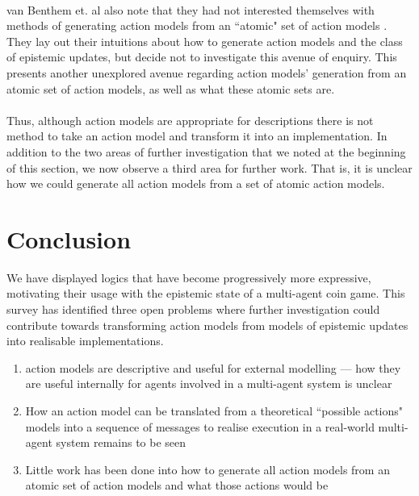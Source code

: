 \documentclass[12pt, a4paper, titlepage]{scrartcl}
\begin{document}
\\
van Benthem et. al also note that they had not interested themselves with methods of
generating action models from an ``atomic" set of action models \cite{benthem2006lcc}.
They lay out their intuitions about how to generate action models and the class
of epistemic updates, but decide not to investigate this avenue of enquiry.
This presents another unexplored avenue regarding action models' generation from
an atomic set of action models, as well as what these atomic sets are.\\
\\
Thus, although action models are appropriate for descriptions there is not
method to take an action model and transform it into an implementation.
In addition to the two areas of further investigation that we noted at the
beginning of this section, we now observe a third area for further work.
That is, it is unclear how we could generate all action models from a
set of atomic action models.

\section{Conclusion} \label{conc}
We have displayed logics that have become progressively more expressive,
motivating their usage with the epistemic state of a multi-agent coin game.
This survey has identified three open problems where further investigation could contribute towards
transforming action models from models of epistemic updates into realisable
implementations.
\begin{enumerate}
	\item action models are descriptive and useful for external modelling --- how
	they are useful internally for agents involved in a multi-agent system is
	unclear
	\item How an action model can be translated from a theoretical ``possible
	actions" models into a sequence of messages to realise execution in a
	real-world multi-agent system remains to be seen
	\item Little work has been done into how to generate all action models from
	an atomic set of action models and what those actions would be
\end{enumerate}



\end{document}
